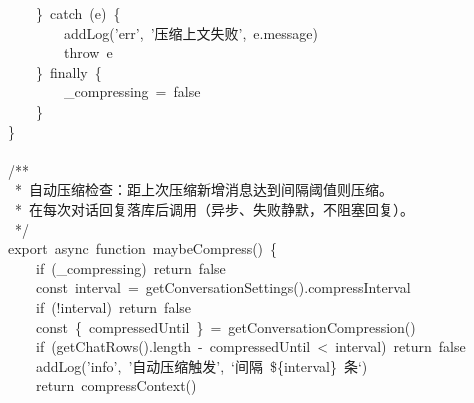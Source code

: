 \documentclass[a4paper,10pt]{article}
\begin{document}
{~~~~\}~catch~(e)~\{\\
~~~~~~~~addLog('err',~'压缩上文失败',~e.message)\\
~~~~~~~~throw~e\\
~~~~\}~finally~\{\\
~~~~~~~~\_compressing~=~false\\
~~~~\}\\
\}\\
\mbox{}\\
/**\\
~*~自动压缩检查：距上次压缩新增消息达到间隔阈值则压缩。\\
~*~在每次对话回复落库后调用（异步、失败静默，不阻塞回复）。\\
~*/\\
export~async~function~maybeCompress()~\{\\
~~~~if~(\_compressing)~return~false\\
~~~~const~interval~=~getConversationSettings().compressInterval\\
~~~~if~(!interval)~return~false\\
~~~~const~\{~compressedUntil~\}~=~getConversationCompression()\\
~~~~if~(getChatRows().length~-~compressedUntil~<~interval)~return~false\\
~~~~addLog('info',~'自动压缩触发',~`间隔~\$\{interval\}~条`)\\
~~~~return~compressContext()
}

\newpage
\end{document}
